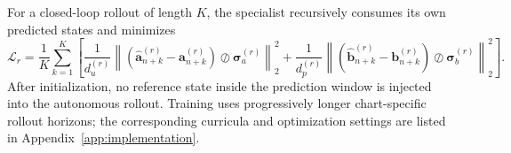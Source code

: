 For a closed-loop rollout of length $K$, the specialist recursively
consumes its own predicted states and minimizes
\begin{equation}
  \mathcal L_r
  =
  \frac{1}{K}
  \sum_{k=1}^{K}
  \left[
    \frac{1}{d_u^{(r)}}
    \left\|
      \left(
        \widehat{\bm a}_{n+k}^{(r)}
        -
        \bm a_{n+k}^{(r)}
      \right)
      \oslash
      \bm\sigma_a^{(r)}
    \right\|_2^2
    +
    \frac{1}{d_p^{(r)}}
    \left\|
      \left(
        \widehat{\bm b}_{n+k}^{(r)}
        -
        \bm b_{n+k}^{(r)}
      \right)
      \oslash
      \bm\sigma_b^{(r)}
    \right\|_2^2
  \right].
  \label{eq:app_true_rollout_loss}
\end{equation}
After initialization, no reference state inside the prediction window is
injected into the autonomous rollout. Training uses progressively longer
chart-specific rollout horizons; the corresponding curricula and
optimization settings are listed in Appendix~\ref{app:implementation}.
